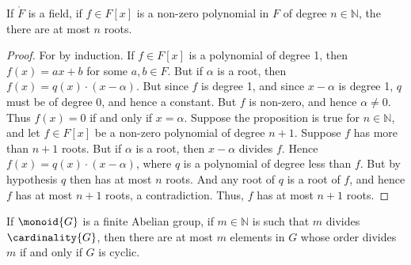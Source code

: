 \documentclass{article}                                                        %
\begin{document}
        \begin{theorem}
            If $\ring{F}$ is a field, if $f\in{F}[x]$ is a non-zero polynomial
            in $F$ of degree $n\in\mathbb{N}$, the there are at most $n$ roots.
        \end{theorem}
        \begin{proof}
            For by induction. If $f\in{F}[x]$ is a polynomial of degree 1, then
            $f(x)=ax+b$ for some $a,b\in{F}$. But if $\alpha$ is a root, then
            $f(x)=q(x)\cdot(x-\alpha)$. But since $f$ is degree 1, and since
            $x-\alpha$ is degree 1, $q$ must be of degree 0, and hence a
            constant. But $f$ is non-zero, and hence $\alpha\ne{0}$. Thus
            $f(x)=0$ if and only if $x=\alpha$. Suppose the proposition is true
            for $n\in\mathbb{N}$, and let $f\in{F}[x]$ be a non-zero polynomial
            of degree $n+1$. Suppose $f$ has more than $n+1$ roots. But if
            $\alpha$ is a root, then $x-\alpha$ divides $f$. Hence
            $f(x)=q(x)\cdot(x-\alpha)$, where $q$ is a polynomial of degree less
            than $f$. But by hypothesis $q$ then has at most $n$ roots. And any
            root of $q$ is a root of $f$, and hence $f$ has at most $n+1$ roots,
            a contradiction. Thus, $f$ has at most $n+1$ roots.
        \end{proof}
        \begin{theorem}
            If $\monoid{G}$ is a finite Abelian group, if $m\in\mathbb{N}$ is
            such that $m$ divides $\cardinality{G}$, then there are at most
            $m$ elements in $G$ whose order divides $m$ if and only if $G$ is
            cyclic.
        \end{theorem}
\end{document}
